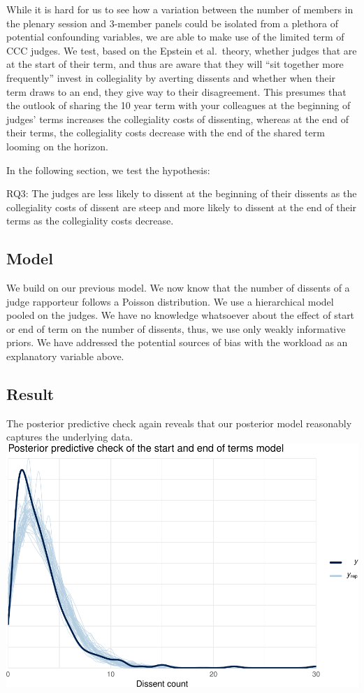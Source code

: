 \documentclass[
  11pt,
]{article}
\begin{document}
While it is hard for us to see how a variation between the number of
members in the plenary session and 3-member panels could be isolated
from a plethora of potential confounding variables, we are able to make
use of the limited term of CCC judges. We test, based on the Epstein et
al.~theory, whether judges that are at the start of their term, and thus
are aware that they will ``sit together more frequently'' invest in
collegiality by averting dissents and whether when their term draws to
an end, they give way to their disagreement. This presumes that the
outlook of sharing the 10 year term with your colleagues at the
beginning of judges' terms increases the collegiality costs of
dissenting, whereas at the end of their terms, the collegiality costs
decrease with the end of the shared term looming on the horizon.

In the following section, we test the hypothesis:

RQ3: The judges are less likely to dissent at the beginning of their
dissents as the collegiality costs of dissent are steep and more likely
to dissent at the end of their terms as the collegiality costs decrease.

\hypertarget{model-1}{%
\subsection{Model}\label{model-1}}

We build on our previous model. We now know that the number of dissents
of a judge rapporteur follows a Poisson distribution. We use a
hierarchical model pooled on the judges. We have no knowledge whatsoever
about the effect of start or end of term on the number of dissents,
thus, we use only weakly informative priors. We have addressed the
potential sources of bias with the workload as an explanatory variable
above.

\hypertarget{result-2}{%
\subsection{Result}\label{result-2}}

The posterior predictive check again reveals that our posterior model
reasonably captures the underlying data.
\includegraphics{dissents_article_files/figure-latex/posterior_check_term-1.pdf}
\end{document}
